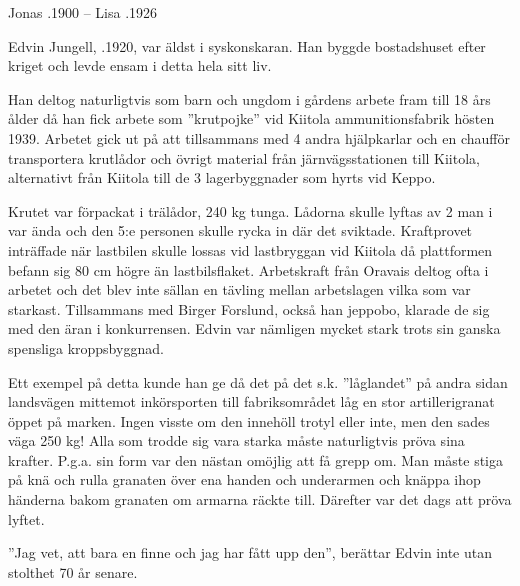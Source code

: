 Jonas .1900  --   Lisa .1926




Edvin Jungell, .1920, var äldst i syskonskaran. Han byggde bostadshuset efter kriget och levde ensam i detta hela sitt liv.


Han deltog naturligtvis som barn och ungdom i gårdens arbete fram till 18 års ålder då han fick arbete som ”krutpojke” vid Kiitola ammunitionsfabrik hösten 1939. Arbetet gick ut på att tillsammans med 4 andra hjälpkarlar och en chaufför transportera krutlådor och övrigt material från järnvägsstationen till Kiitola, alternativt från Kiitola till de 3 lagerbyggnader som hyrts vid Keppo.

Krutet var förpackat i trälådor, 240 kg tunga. Lådorna skulle lyftas av 2 man i var ända och den 5:e personen skulle rycka in där det sviktade. Kraftprovet inträffade när lastbilen skulle lossas vid lastbryggan vid Kiitola då plattformen befann sig 80 cm högre än lastbilsflaket. Arbetskraft från Oravais deltog ofta i arbetet och det blev inte sällan en tävling mellan arbetslagen vilka som var starkast. Tillsammans med Birger Forslund, också han jeppobo, klarade de sig med den äran i konkurrensen. Edvin var nämligen mycket stark trots sin ganska spensliga kroppsbyggnad.

Ett exempel på detta kunde han ge då det på det s.k. ”låglandet” på andra sidan landsvägen mittemot inkörsporten till fabriksområdet låg en stor artillerigranat öppet på marken. Ingen visste om den innehöll trotyl eller inte, men den sades väga 250 kg! Alla som trodde sig vara starka måste naturligtvis pröva sina krafter. P.g.a. sin form var den nästan omöjlig att få grepp om. Man måste stiga på knä och rulla granaten över ena handen och underarmen och knäppa ihop händerna bakom granaten om armarna räckte till. Därefter var det dags att pröva lyftet.

”Jag vet, att bara en finne och jag har fått upp den”, berättar Edvin inte utan stolthet 70 år senare.

